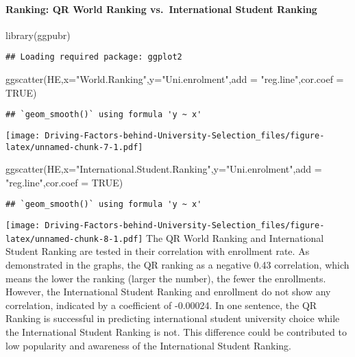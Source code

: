 \documentclass[
]{article}
\newenvironment{Shaded}{\begin{snugshade}}{\end{snugshade}}
\newcommand{\AttributeTok}[1]{\textcolor[rgb]{0.77,0.63,0.00}{#1}}
\newcommand{\ConstantTok}[1]{\textcolor[rgb]{0.00,0.00,0.00}{#1}}
\newcommand{\FunctionTok}[1]{\textcolor[rgb]{0.00,0.00,0.00}{#1}}
\newcommand{\NormalTok}[1]{#1}
\newcommand{\StringTok}[1]{\textcolor[rgb]{0.31,0.60,0.02}{#1}}
\begin{document}
\hypertarget{ranking-qr-world-ranking-vs.-international-student-ranking}{%
\paragraph{Ranking: QR World Ranking vs.~International Student
Ranking}\label{ranking-qr-world-ranking-vs.-international-student-ranking}}

\begin{Shaded}
\begin{Highlighting}[]
\FunctionTok{library}\NormalTok{(ggpubr)}
\end{Highlighting}
\end{Shaded}

\begin{verbatim}
## Loading required package: ggplot2
\end{verbatim}

\begin{Shaded}
\begin{Highlighting}[]
\FunctionTok{ggscatter}\NormalTok{(HE,}\AttributeTok{x=}\StringTok{"World.Ranking"}\NormalTok{,}\AttributeTok{y=}\StringTok{"Uni.enrolment"}\NormalTok{,}\AttributeTok{add =} \StringTok{"reg.line"}\NormalTok{,}\AttributeTok{cor.coef =} \ConstantTok{TRUE}\NormalTok{)}
\end{Highlighting}
\end{Shaded}

\begin{verbatim}
## `geom_smooth()` using formula 'y ~ x'
\end{verbatim}

\texttt{[image: Driving-Factors-behind-University-Selection\_files/figure-latex/unnamed-chunk-7-1.pdf]}

\begin{Shaded}
\begin{Highlighting}[]
\FunctionTok{ggscatter}\NormalTok{(HE,}\AttributeTok{x=}\StringTok{"International.Student.Ranking"}\NormalTok{,}\AttributeTok{y=}\StringTok{"Uni.enrolment"}\NormalTok{,}\AttributeTok{add =} \StringTok{"reg.line"}\NormalTok{,}\AttributeTok{cor.coef =} \ConstantTok{TRUE}\NormalTok{)}
\end{Highlighting}
\end{Shaded}

\begin{verbatim}
## `geom_smooth()` using formula 'y ~ x'
\end{verbatim}

\texttt{[image: Driving-Factors-behind-University-Selection\_files/figure-latex/unnamed-chunk-8-1.pdf]}
The QR World Ranking and International Student Ranking are tested in
their correlation with enrollment rate. As demonstrated in the graphs,
the QR ranking as a negative 0.43 correlation, which means the lower the
ranking (larger the number), the fewer the enrollments. However, the
International Student Ranking and enrollment do not show any
correlation, indicated by a coefficient of -0.00024. In one sentence,
the QR Ranking is successful in predicting international student
university choice while the International Student Ranking is not. This
difference could be contributed to low popularity and awareness of the
International Student Ranking.
\end{document}
